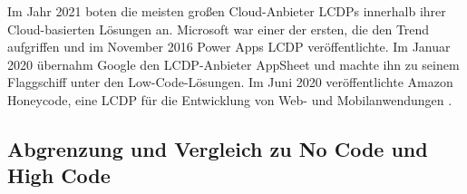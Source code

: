 \documentclass[12pt]{article} %
\begin{document}
	Im Jahr 2021 boten die meisten großen Cloud-Anbieter LCDPs innerhalb ihrer Cloud-basierten Lösungen an. Microsoft war einer der ersten, die den Trend aufgriffen und im November 2016 Power Apps LCDP veröffentlichte. Im Januar 2020 übernahm Google den LCDP-Anbieter AppSheet und machte ihn zu seinem Flaggschiff unter den Low-Code-Lösungen. Im Juni 2020 veröffentlichte Amazon Honeycode, eine LCDP für die Entwicklung von Web- und Mobilanwendungen \cite{DiRuscio.2022}.
		

	
	
	
	
	
	
	\subsection{Abgrenzung und Vergleich zu No Code und High Code}
	
\end{document}

